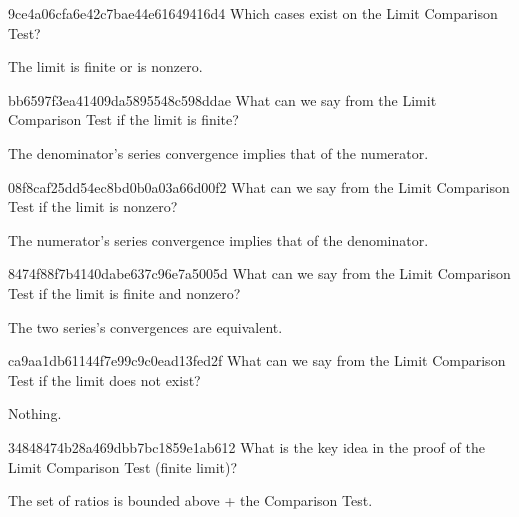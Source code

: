 \begin{note}{9ce4a06cfa6e42c7bae44e61649416d4}
    Which cases exist on the Limit Comparison Test?

    \begin{cloze}{1}
        The limit is finite or is nonzero.
    \end{cloze}
\end{note}

\begin{note}{bb6597f3ea41409da5895548c598ddae}
    What can we say from the Limit Comparison Test if the limit is finite?

    \begin{cloze}{1}
        The denominator's series convergence implies that of the numerator.
    \end{cloze}
\end{note}

\begin{note}{08f8caf25dd54ec8bd0b0a03a66d00f2}
    What can we say from the Limit Comparison Test if the limit is nonzero?

    \begin{cloze}{1}
        The numerator's series convergence implies that of the denominator.
    \end{cloze}
\end{note}

\begin{note}{8474f88f7b4140dabe637c96e7a5005d}
    What can we say from the Limit Comparison Test if the limit is finite and nonzero?

    \begin{cloze}{1}
        The two series's convergences are equivalent.
    \end{cloze}
\end{note}

\begin{note}{ca9aa1db61144f7e99c9c0ead13fed2f}
    What can we say from the Limit Comparison Test if the limit does not exist?

    \begin{cloze}{1}
        Nothing.
    \end{cloze}
\end{note}

\begin{note}{34848474b28a469dbb7bc1859e1ab612}
    What is the key idea in the proof of the Limit Comparison Test (finite limit)?

    \begin{cloze}{1}
        The set of ratios is bounded above + the Comparison Test.
    \end{cloze}
\end{note}


